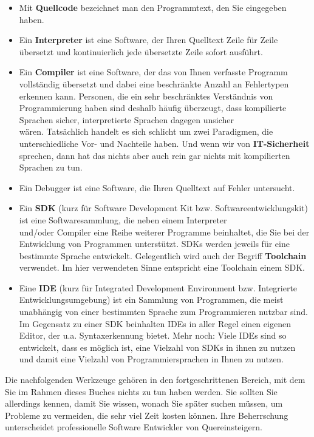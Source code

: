 \begin{itemize}
	\item Mit \textbf{Quellcode} bezeichnet man den Programmtext, den Sie eingegeben haben.
	\item Ein \textbf{Interpreter} ist eine Software, der Ihren Quelltext Zeile für Zeile übersetzt und kontinuierlich jede übersetzte Zeile sofort ausführt.
	\item Ein \textbf{Compiler} ist eine Software, der das von Ihnen verfasste Programm vollständig übersetzt und dabei eine beschränkte Anzahl an Fehlertypen erkennen kann. Personen, die ein sehr beschränktes Verständnis von Programmierung haben sind deshalb häufig überzeugt, dass kompilierte Sprachen sicher, interpretierte Sprachen dagegen unsicher \\wären. Tatsächlich handelt es sich schlicht um zwei Paradigmen, die unterschiedliche Vor- und Nachteile haben. Und wenn wir von \textbf{IT-Sicherheit} sprechen, dann hat das nichts aber auch rein gar nichts mit kompilierten Sprachen zu tun.
	\item Ein Debugger ist eine Software, die Ihren Quelltext auf Fehler untersucht.
	\item Ein \textbf{SDK} (kurz für Software Development Kit bzw. Softwareentwicklungskit) ist eine Softwaresammlung, die neben einem Interpreter \\und/oder Compiler eine Reihe weiterer Programme beinhaltet, die Sie bei der Entwicklung von Programmen unterstützt. SDKs werden jeweils für eine bestimmte Sprache entwickelt. Gelegentlich wird auch der Begriff \textbf{Toolchain} verwendet. Im hier verwendeten Sinne entspricht eine Toolchain einem SDK.
	\item Eine \textbf{IDE} (kurz für Integrated Development Environment bzw. Integrierte Entwicklungsumgebung) ist ein Sammlung von Programmen, die meist unabhängig von einer bestimmten Sprache zum Programmieren nutzbar sind. Im Gegensatz zu einer SDK beinhalten IDEs in aller Regel einen eigenen Editor, der u.a. Syntaxerkennung bietet. Mehr noch: Viele IDEs sind so entwickelt, dass es möglich ist, eine Vielzahl von SDKs in ihnen zu nutzen und damit eine Vielzahl von Programmiersprachen in Ihnen zu nutzen.
\end{itemize}

Die nachfolgenden Werkzeuge gehören in den fortgeschrittenen Bereich, mit dem Sie im Rahmen dieses Buches nichts zu tun haben werden. Sie sollten Sie allerdings kennen, damit Sie wissen, wonach Sie später suchen müssen, um Probleme zu vermeiden, die sehr viel Zeit kosten können. Ihre Beherrschung unterscheidet professionelle Software Entwickler von Quereinsteigern.\\

